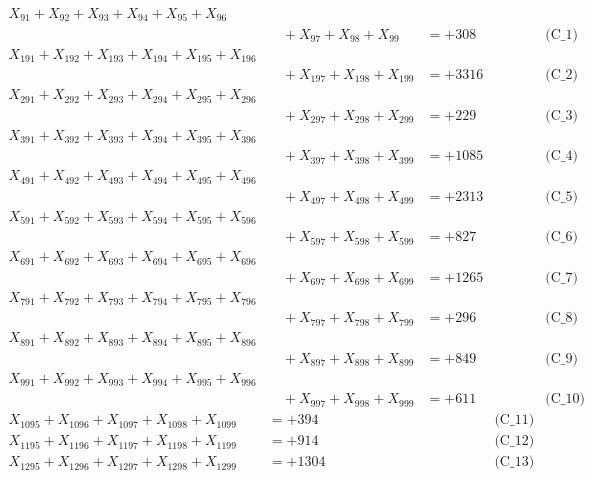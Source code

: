 \documentclass[a4paper,10pt]{article}
\begin{document}
\allowdisplaybreaks
{\small
\begin{align}
X_{91} + X_{92} + X_{93} + X_{94} + X_{95} + X_{96} \\[0.1ex]
&\quad  + X_{97} + X_{98} + X_{99} &= +308 && \text{(C\_1)} \\
X_{191} + X_{192} + X_{193} + X_{194} + X_{195} + X_{196} \\[0.1ex]
&\quad  + X_{197} + X_{198} + X_{199} &= +3316 && \text{(C\_2)} \\
X_{291} + X_{292} + X_{293} + X_{294} + X_{295} + X_{296} \\[0.1ex]
&\quad  + X_{297} + X_{298} + X_{299} &= +229 && \text{(C\_3)} \\
X_{391} + X_{392} + X_{393} + X_{394} + X_{395} + X_{396} \\[0.1ex]
&\quad  + X_{397} + X_{398} + X_{399} &= +1085 && \text{(C\_4)} \\
X_{491} + X_{492} + X_{493} + X_{494} + X_{495} + X_{496} \\[0.1ex]
&\quad  + X_{497} + X_{498} + X_{499} &= +2313 && \text{(C\_5)} \\
\allowbreak
X_{591} + X_{592} + X_{593} + X_{594} + X_{595} + X_{596} \\[0.1ex]
&\quad  + X_{597} + X_{598} + X_{599} &= +827 && \text{(C\_6)} \\
X_{691} + X_{692} + X_{693} + X_{694} + X_{695} + X_{696} \\[0.1ex]
&\quad  + X_{697} + X_{698} + X_{699} &= +1265 && \text{(C\_7)} \\
X_{791} + X_{792} + X_{793} + X_{794} + X_{795} + X_{796} \\[0.1ex]
&\quad  + X_{797} + X_{798} + X_{799} &= +296 && \text{(C\_8)} \\
X_{891} + X_{892} + X_{893} + X_{894} + X_{895} + X_{896} \\[0.1ex]
&\quad  + X_{897} + X_{898} + X_{899} &= +849 && \text{(C\_9)} \\
X_{991} + X_{992} + X_{993} + X_{994} + X_{995} + X_{996} \\[0.1ex]
&\quad  + X_{997} + X_{998} + X_{999} &= +611 && \text{(C\_10)} \\
\allowbreak
X_{1095} + X_{1096} + X_{1097} + X_{1098} + X_{1099} &= +394 && \text{(C\_11)} \\
X_{1195} + X_{1196} + X_{1197} + X_{1198} + X_{1199} &= +914 && \text{(C\_12)} \\
X_{1295} + X_{1296} + X_{1297} + X_{1298} + X_{1299} &= +1304 && \text{(C\_13)} \\

\end{align}}
\end{document}
